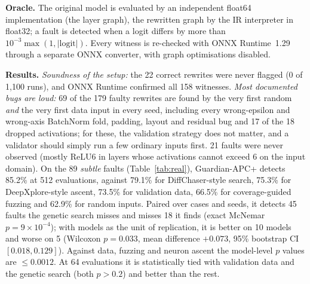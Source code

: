 \documentclass[conference]{IEEEtran}
\begin{document}
\textbf{Oracle.} The original model is evaluated by an independent float64 implementation (the layer graph), the rewritten graph by the IR interpreter in float32; a fault is detected when a logit differs by more than $10^{-3}\max(1,|\text{logit}|)$. Every witness is re-checked with ONNX Runtime~1.29 through a separate ONNX converter, with graph optimisations disabled.

\begin{table}[t]
\centering\scriptsize

\caption{Detection rate (\%) on the 89 subtle faults at budgets of 16, 64 and 512 model evaluations, and mean evaluations to first detection (censored at 512). 21 models, 5 seeds.}
\label{tab:real}
\end{table}

\textbf{Results.} \emph{Soundness of the setup:} the 22 correct rewrites were never flagged (0 of 1{,}100 runs), and ONNX Runtime confirmed all 158 witnesses. \emph{Most documented bugs are loud:} 69 of the 179 faulty rewrites are found by the very first random \emph{and} the very first data input in every seed, including every wrong-epsilon and wrong-axis BatchNorm fold, padding, layout and residual bug and 17 of the 18 dropped activations; for these, the validation strategy does not matter, and a validator should simply run a few ordinary inputs first. 21 faults were never observed (mostly ReLU6 in layers whose activations cannot exceed 6 on the input domain). On the 89 \emph{subtle} faults (Table~\ref{tab:real}), Guardian-APC+ detects 85.2\% at 512 evaluations, against 79.1\% for DiffChaser-style search, 75.3\% for DeepXplore-style ascent, 73.5\% for validation data, 66.5\% for coverage-guided fuzzing and 62.9\% for random inputs. Paired over cases and seeds, it detects 45 faults the genetic search misses and misses 18 it finds (exact McNemar $p=9\times10^{-4}$); with models as the unit of replication, it is better on 10 models and worse on 5 (Wilcoxon $p=0.033$, mean difference $+0.073$, 95\% bootstrap CI $[0.018, 0.129]$). Against data, fuzzing and neuron ascent the model-level $p$ values are $\le0.0012$. At 64 evaluations it is statistically tied with validation data and the genetic search (both $p>0.2$) and better than the rest.
\end{document}

